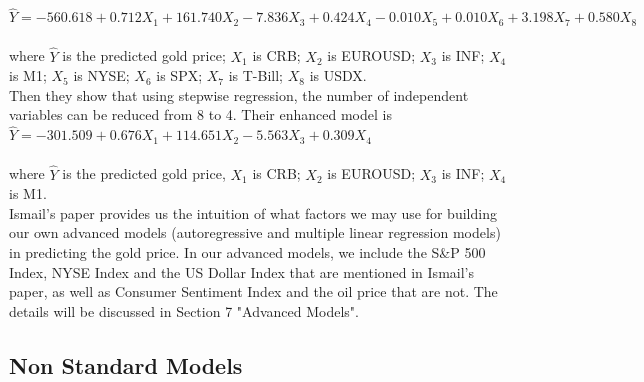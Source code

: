 \documentclass[runningheads]{llncs}
\begin{document}
$\hat{Y}=-560.618+0.712X_1+161.740X_2-7.836X_3 +0.424X_4-0.010X_5+0.010X_6+3.198X_7+0.580X_8$ \\\\
where $\hat{Y}$ is the predicted gold price; $X_1$ is CRB; $X_2$ is EUROUSD; $X_3$ is INF; $X_4$ is M1; $X_5$ is NYSE; $X_6$ is SPX; $X_7$ is T-Bill; $X_8$ is USDX.\\

\noindent Then they show that using stepwise regression, the number of independent variables can be reduced from 8 to 4. Their enhanced model is  \\

$\hat{Y}=-301.509+0.676X_1+114.651X_2-5.563X_3+0.309X_4$ \\\\
where $\hat{Y}$ is the predicted gold price, $X_1$ is CRB; $X_2$ is EUROUSD; $X_3$ is INF; $X_4$ is M1. \\

\noindent Ismail's paper provides us the intuition of what factors we may use for building our own advanced models (autoregressive and multiple linear regression models) in predicting the gold price. In our advanced models, we include the S\&P 500 Index, NYSE Index and the US Dollar Index that are mentioned in Ismail's paper, as well as Consumer Sentiment Index and the oil price that are not. The details will be discussed in Section 7 "Advanced Models".\\

\subsection{Non Standard Models}
\end{document}
